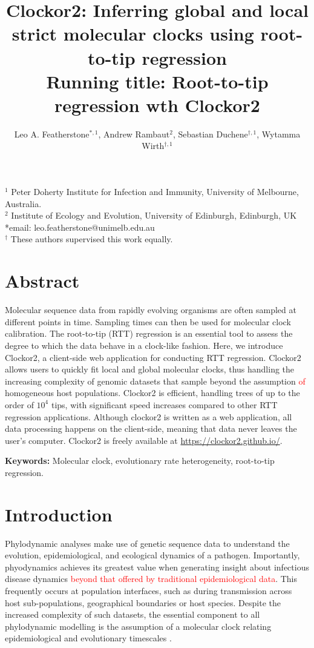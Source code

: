\documentclass{article}
\title{Clockor2:  Inferring global and local strict molecular clocks using root-to-tip regression \\ \large Running title: Root-to-tip regression wth Clockor2}
\author{Leo A. Featherstone$^{\ast,1}$, Andrew Rambaut$^{2}$, Sebastian Duchene$^{\dagger,1}$, Wytamma Wirth$^{\dagger,1}$\\}
\date{}
\begin{document}
\maketitle

$^{1}$ Peter Doherty Institute for Infection and Immunity, University of Melbourne, Australia.\\
$^{2}$ Institute of Ecology and Evolution, University of Edinburgh, Edinburgh, UK\\
*email: leo.featherstone@unimelb.edu.au\\
$^{\dagger}$ These authors supervised this work equally.

\linenumbers
\section*{Abstract}
Molecular sequence data from rapidly evolving organisms are often sampled at different points in time. Sampling times can then be used for molecular clock calibration. The root-to-tip (RTT) regression is an essential tool to assess the degree to which the data behave in a clock-like fashion. Here, we introduce Clockor2, a client-side web application for conducting RTT regression. Clockor2 allows users to quickly fit local and global molecular clocks, thus handling the increasing complexity of genomic datasets that sample beyond the assumption \textcolor{red}{of} homogeneous host populations. Clockor2 is efficient, handling trees of up to the order of $10^4$ tips, with significant speed increases compared to other RTT regression applications. Although clockor2 is written as a web application, all data processing happens on the client-side, meaning that data never leaves the user's computer. Clockor2 is freely available at \url{https://clockor2.github.io/}.

\textbf{Keywords:} Molecular clock, evolutionary rate heterogeneity, root-to-tip regression.

\section*{Introduction}
Phylodynamic analyses make use of genetic sequence data to understand the evolution, epidemiological, and ecological dynamics of a pathogen. Importantly, phyodynamics achieves its greatest value when generating insight about infectious disease dynamics \textcolor{red}{beyond that offered by traditional epidemiological data}. This frequently occurs at population interfaces, such as during transmission across host sub-populations,  geographical boundaries or host species. Despite the increased complexity of such datasets, the essential component to all phylodynamic modelling is the assumption of a molecular clock relating epidemiological and evolutionary timescales \citep{biek_measurably_2015}.
\end{document}
